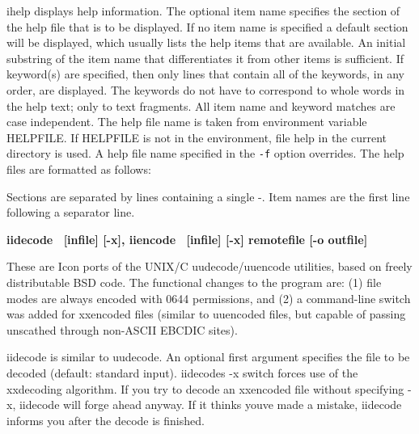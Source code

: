 \textsf{ihelp} displays help information. The optional item name
specifies the section of the help file that is to be displayed. If no
item name is specified a default section will be displayed, which
usually lists the help items that are available. An initial substring
of the item name that differentiates it from other items is sufficient.
If keyword(s) are specified, then only lines that contain all of the
keywords, in any order, are displayed. The keywords do not have to
correspond to whole words in the help text; only to text fragments. All
item name and keyword matches are case independent. The help file name
is taken from environment variable
HELPFILE. If HELPFILE is not in the environment, file
{\textquotedbl}help{\textquotedbl} in the current directory is used. A
help file name specified in the \texttt{{}-f} option overrides. The
help files are formatted as follows:


Sections are separated by lines containing a single
{\textquotedbl}-{\textquotedbl}. Item names are the first line
following a separator line.

{\sffamily\bfseries
iidecode \ \textrm{\textmd{[infile] [-x]}}, iiencode
\ \textrm{\textmd{[infile] [-x] remotefile [-o outfile]}}}

These are Icon ports of the UNIX/C uudecode/uuencode utilities, based on freely distributable BSD code.
The functional changes to the program are: (1) file modes are always
encoded with 0644 permissions, and (2) a command-line switch was added
for xxencoded files (similar to uuencoded files, but capable of passing
unscathed through non-ASCII EBCDIC sites).

\textsf{iidecode} is similar to uudecode. An optional first argument
specifies the file to be decoded (default: standard input).
\textsf{iidecode}{\textquotesingle}s \textsf{{}-x} switch forces use of
the xxdecoding algorithm. If you try to decode an xxencoded file
without specifying \textsf{{}-x}, \textsf{iidecode} will forge ahead
anyway. If it thinks you{\textquotesingle}ve made a mistake,
\textsf{iidecode} informs you after the decode is finished.

